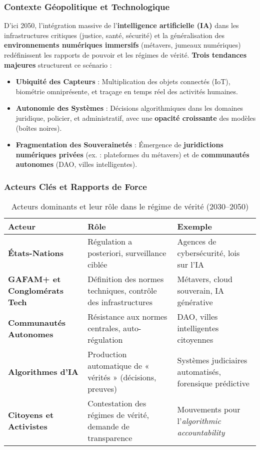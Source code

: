 \documentclass[a4paper,12pt]{report}
\begin{document}
	\subsubsection{Contexte Géopolitique et Technologique}
	D’ici 2050, l’intégration massive de l’\textbf{intelligence artificielle (IA)} dans les infrastructures critiques (justice, santé, sécurité) et la généralisation des \textbf{environnements numériques immersifs} (métavers, jumeaux numériques) redéfinissent les rapports de pouvoir et les régimes de vérité.
	\textbf{Trois tendances majeures} structurent ce scénario :
	\begin{itemize}
		\item \textbf{Ubiquité des Capteurs} : Multiplication des objets connectés (IoT), biométrie omniprésente, et traçage en temps réel des activités humaines.
		\item \textbf{Autonomie des Systèmes} : Décisions algorithmiques dans les domaines juridique, policier, et administratif, avec une \textbf{opacité croissante} des modèles (boîtes noires).
		\item \textbf{Fragmentation des Souverainetés} : Émergence de \textbf{juridictions numériques privées} (ex. : plateformes du métavers) et de \textbf{communautés autonomes} (DAO, villes intelligentes).
	\end{itemize}
	
	\subsubsection{Acteurs Clés et Rapports de Force}
	\begin{table}[h]
		\centering
		\caption{Acteurs dominants et leur rôle dans le régime de vérité (2030--2050)}
		\label{tab:acteurs_2050}
		\begin{tabular}{|p{3cm}|p{4cm}|p{6cm}|}
			\hline
			\textbf{Acteur} & \textbf{Rôle} & \textbf{Exemple} \\ \hline
			\textbf{États-Nations} & Régulation a posteriori, surveillance ciblée & Agences de cybersécurité, lois sur l’IA \\ \hline
			\textbf{GAFAM+ et Conglomérats Tech} & Définition des normes techniques, contrôle des infrastructures & Métavers, cloud souverain, IA générative \\ \hline
			\textbf{Communautés Autonomes} & Résistance aux normes centrales, auto-régulation & DAO, villes intelligentes citoyennes \\ \hline
			\textbf{Algorithmes d’IA} & Production automatique de « vérités » (décisions, preuves) & Systèmes judiciaires automatisés, forensique prédictive \\ \hline
			\textbf{Citoyens et Activistes} & Contestation des régimes de vérité, demande de transparence & Mouvements pour l’\textit{algorithmic accountability} \\ \hline
		\end{tabular}
	\end{table}
	
\end{document}
